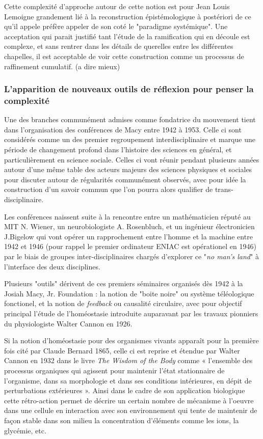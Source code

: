 Cette complexité d'approche autour de cette notion est pour Jean Louis Lemoigne grandement lié à la reconstruction épistémologique à postériori de ce qu'il appele préfère appeler de son coté le "paradigme systémique". Une acceptation qui parait justifié tant l'étude de la ramification qui en découle est complexe, et sans rentrer dans les détails de querelles entre les différentes chapelles, il est acceptable de voir cette construction comme un processus de raffinement cumulatif. (a dire mieux)

\subsubsection{L'apparition de nouveaux outils de réflexion pour penser la complexité}

Une des branches communément admises comme fondatrice du mouvement tient dans l'organisation des conférences de Macy entre 1942 à 1953. Celle ci sont considérés comme un des premier regroupement interdisciplinaire et marque une période de changement profond dans l'histoire des sciences en général, et particulièrement en science sociale. Celles ci vont réunir pendant plusieurs années autour d'une même table des acteurs majeurs des sciences physiques et sociales pour discuter autour de régularités communément observés, avec pour idée la construction d'un savoir commun que l'on pourra alors qualifier de trans-disciplinaire. 

Les conférences naissent suite à la rencontre entre un mathématicien réputé au MIT N. Wiener, un neurobiologiste A. Rosenbluch, et un ingénieur électronicien J.Bigelow qui vont opérer un rapprochement entre l'homme et la machine entre 1942 et 1946 (pour rappel le premier ordinateur ENIAC est opérationel en 1946) par le biais de groupes inter-disciplinaires chargés d'explorer ce "\textit{no man's land}" à l'interface des deux disciplines. 

Plusieurs "outils" dérivent de ces premiers séminaires organisés dès 1942 à la Josiah Macy, Jr. Foundation : la notion de "boite noire" ou système téléologique fonctionel, et la notion de \textit{feedback} ou causalité circulaire, avec pour objectif principal l'étude de l'homéostasie introduite auparavant par les travaux pionniers du physiologiste Walter Cannon en 1926.

Si la notion d'homéostasie pour des organismes vivants apparaît pour la première fois cité par Claude Bernard 1865, celle ci est reprise et étendue par Walter Cannon en 1932 dans le livre \textit{The Wisdom of the Body} \autocite{Cannon1932} comme « l’ensemble des processus organiques qui agissent pour maintenir l’état stationnaire de l’organisme, dans sa morphologie et dans ses conditions intérieures, en dépit de perturbations extérieures ». Ainsi dans le cadre de son application biologique cette rétro-action permet de décrire un certain nombre de mécanisme à l'oeuvre dans une cellule en interaction avec son environnement qui tente de maintenir de façon stable dans son milieu la concentration d'éléments comme les ions, la glycémie, etc.

